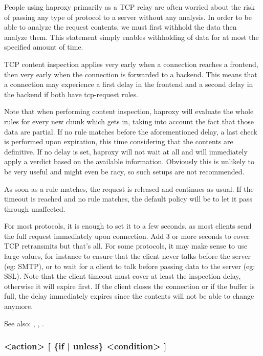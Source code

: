 {  People using haproxy primarily as a TCP relay are often worried about the
  risk of passing any type of protocol to a server without any analysis. In
  order to be able to analyze the request contents, we must first withhold
  the data then analyze them. This statement simply enables withholding of
  data for at most the specified amount of time.

  TCP content inspection applies very early when a connection reaches a
  frontend, then very early when the connection is forwarded to a backend. This
  means that a connection may experience a first delay in the frontend and a
  second delay in the backend if both have tcp-request rules.

  Note that when performing content inspection, haproxy will evaluate the whole
  rules for every new chunk which gets in, taking into account the fact that
  those data are partial. If no rule matches before the aforementioned delay,
  a last check is performed upon expiration, this time considering that the
  contents are definitive. If no delay is set, haproxy will not wait at all
  and will immediately apply a verdict based on the available information.
  Obviously this is unlikely to be very useful and might even be racy, so such
  setups are not recommended.

  As soon as a rule matches, the request is released and continues as usual. If
  the timeout is reached and no rule matches, the default policy will be to let
  it pass through unaffected.

  For most protocols, it is enough to set it to a few seconds, as most clients
  send the full request immediately upon connection. Add 3 or more seconds to
  cover TCP retransmits but that's all. For some protocols, it may make sense
  to use large values, for instance to ensure that the client never talks
  before the server (eg: SMTP), or to wait for a client to talk before passing
  data to the server (eg: SSL). Note that the client timeout must cover at
  least the inspection delay, otherwise it will expire first. If the client
  closes the connection or if the buffer is full, the delay immediately expires
  since the contents will not be able to change anymore.

  See also: , ,
            .

\subsubsection[tcp-response content]{ <action> [ \{if | unless\} <condition> ]}

}
